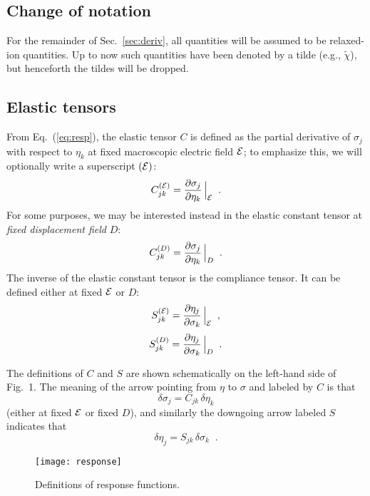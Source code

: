 \documentclass[11pt,fleqn]{article}
\def\beq{\begin{equation}}
\def\eeq{\end{equation}}
\def\wt#1{\widetilde{#1}}
\def\E{{\cal E}}
\begin{document}
\subsection{Change of notation}

For the remainder of Sec.~\ref{sec:deriv}, all quantities will
be assumed to be relaxed-ion quantities.  Up to now such quantities
have been denoted by a tilde (e.g., $\wt{\chi}$), but henceforth
the tildes will be dropped.

\subsection{Elastic tensors}
\label{sec:elas}

From Eq.~(\ref{eq:resp}), the elastic tensor $C$ is defined
as the partial derivative of $\sigma_j$ with respect to $\eta_k$
at fixed macroscopic electric field $\E$; to emphasize this,
we will optionally write a superscript $(\E)$:
%
\beq
C_{jk}^{(\E)}={\partial\sigma_j\over\partial\eta_k}\,\Big\vert_\E
\;\;.
\eeq
%
For some purposes, we may be interested instead in the elastic
constant tensor at {\it fixed displacement field} $D$:
%
\beq
C_{jk}^{(D)}={\partial\sigma_j\over\partial\eta_k}\,\Big\vert_D
\;\;.
\eeq
%
The inverse of the elastic constant tensor is the compliance
tensor.  It can be defined either at fixed $\E$ or $D$:
%
\beq
S_{jk}^{(\E)}={\partial\eta_j\over\partial\sigma_k}\,\Big\vert_\E
\;\;,
\eeq
%
\beq
S_{jk}^{(D)}={\partial\eta_j\over\partial\sigma_k}\,\Big\vert_D
\;\;.
\eeq

The definitions of $C$ and $S$ are shown schematically on the left-hand
side of Fig.~1.  The meaning of the arrow pointing from $\eta$ to
$\sigma$ and labeled by $C$ is that
%
\[ \delta\sigma_j=C_{jk}\,\delta\eta_k \]
%
(either at fixed $\E$ or fixed $D$), and similarly the downgoing
arrow labeled $S$ indicates that
%
\[ \delta\eta_j=S_{jk}\,\delta\sigma_k \;\;. \]

\begin{figure}
\begin{center}
\texttt{[image: response]}
\end{center}
\caption{Definitions of response functions.}
\label{fig:response}
\end{figure}
\end{document}
